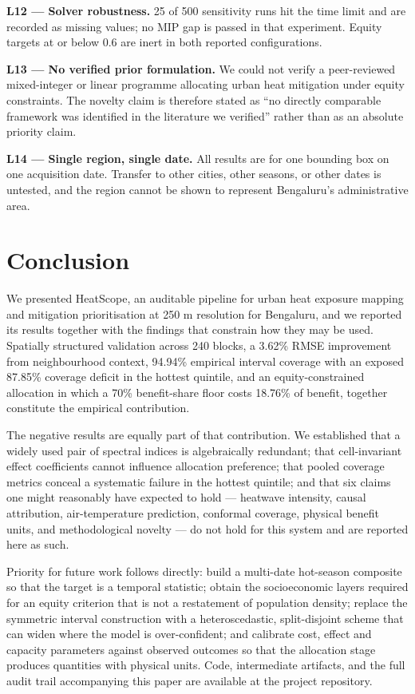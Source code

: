 \documentclass[conference]{IEEEtran}
\begin{document}
\textbf{L12 --- Solver robustness.} 25 of 500 sensitivity runs hit the time limit and are recorded as
missing values; no MIP gap is passed in that experiment. Equity targets at or below 0.6 are inert in
both reported configurations.

\textbf{L13 --- No verified prior formulation.} We could not verify a peer-reviewed mixed-integer or linear
programme allocating urban heat mitigation under equity constraints. The novelty claim is therefore
stated as ``no directly comparable framework was identified in the literature we verified'' rather than
as an absolute priority claim.

\textbf{L14 --- Single region, single date.} All results are for one bounding box on one acquisition date.
Transfer to other cities, other seasons, or other dates is untested, and the region cannot be shown to
represent Bengaluru's administrative area.

\section{Conclusion}\label{ix.-conclusion}

We presented HeatScope, an auditable pipeline for urban heat exposure mapping and mitigation
prioritisation at 250 m resolution for Bengaluru, and we reported its results together with the
findings that constrain how they may be used. Spatially structured validation across 240 blocks, a
3.62\% RMSE improvement from neighbourhood context, 94.94\% empirical interval coverage with an
exposed 87.85\% coverage deficit in the hottest quintile, and an equity-constrained allocation in which
a 70\% benefit-share floor costs 18.76\% of benefit, together constitute the empirical contribution.

The negative results are equally part of that contribution. We established that a widely used pair of
spectral indices is algebraically redundant; that cell-invariant effect coefficients cannot influence
allocation preference; that pooled coverage metrics conceal a systematic failure in the hottest
quintile; and that six claims one might reasonably have expected to hold --- heatwave intensity,
causal attribution, air-temperature prediction, conformal coverage, physical benefit units, and
methodological novelty --- do not hold for this system and are reported here as such.

Priority for future work follows directly: build a multi-date hot-season composite so that the target
is a temporal statistic; obtain the socioeconomic layers required for an equity criterion that is not
a restatement of population density; replace the symmetric interval construction with a
heteroscedastic, split-disjoint scheme that can widen where the model is over-confident; and calibrate
cost, effect and capacity parameters against observed outcomes so that the allocation stage produces
quantities with physical units. Code, intermediate artifacts, and the full audit trail accompanying
this paper are available at the project repository.
\end{document}
